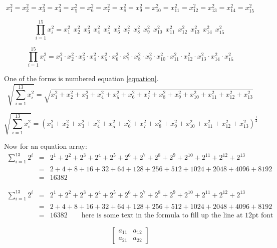 \documentclass[12pt,a4paper,onecolumn]{article}
\begin{document}
\begin{displaymath}
x_1^2 = x_2^2 = x_3^2 = x_4^2 = x_5^2 = x_6^2 = x_7^2 = x_8^2 = x_9^2 = x_{10}^2 = x_{11}^2 = x_{12}^2 = x_{13}^2 = x_{14}^2 = x_{15}^2 
\end{displaymath}

\[
\prod_{i=1}^{15} x_i^2 = x_1^2\ \ x_2^2\ \ x_3^2\ \ x_4^2\ \ x_5^2\ \ x_6^2\ \ x_7^2\ \ x_8^2\ \ x_9^2\ \ x_{10}^2\ \ x_{11}^2\ \ x_{12}^2\ \ x_{13}^2\ \ x_{14}^2\ \ x_{15}^2\ 
\]

$$
\prod_{i=1}^{15} x_i^2 = x_1^2 \cdot x_2^2 \cdot x_3^2 \cdot x_4^2 \cdot x_5^2 \cdot x_6^2 \cdot x_7^2 \cdot x_8^2 \cdot x_9^2 \cdot x_{10}^2 \cdot x_{11}^2 \cdot x_{12}^2 \cdot x_{13}^2 \cdot x_{14}^2 \cdot x_{15}^2 
$$

One of the forms is numbered equation \ref{equation}.
\[
\sqrt{\sum_{i=1}^{13} x_i^2} = \sqrt{x_1^2 + x_2^2 + x_3^2 + x_4^2 + x_5^2 + x_6^2 + x_7^2 + x_8^2 + x_9^2 + x_{10}^2+ x_{11}^2 + x_{12}^2 + x_{13}^2 }
\]

\[
\sqrt{\sum_{i=1}^{13} x_i^2} = \left(x_1^2 + x_2^2 + x_3^2 + x_4^2 + x_5^2 + x_6^2 + x_7^2 + x_8^2 + x_9^2 + x_{10}^2+ x_{11}^2 + x_{12}^2 + x_{13}^2 \right)^{\frac{1}{2}}
\]

Now for an equation array:
\begin{eqnarray}
\sum_{i=1}^{13} 2^i &=& 2^1 + 2^2 + 2^3 + 2^4 + 2^5 + 2^6 + 2^7 + 2^8 + 2^9 + 2^{10} + 2^{11} + 2^{12} + 2^{13}\nonumber\\
&=&2 + 4 + 8 + 16 + 32 + 64 + 128 + 256 + 512 + 1024 + 2048 + 4096 + 8192 \nonumber\\
&=&16382 
\end{eqnarray}

\begin{eqnarray*}
\sum_{i=1}^{13} 2^i &=& 2^1 + 2^2 + 2^3 + 2^4 + 2^5 + 2^6 + 2^7 + 2^8 + 2^9 + 2^{10} + 2^{11} + 2^{12} + 2^{13}\\
&=&2 + 4 + 8 + 16 + 32 + 64 + 128 + 256 + 512 + 1024 + 2048 + 4096 + 8192\\
&=&16382 \qquad\mbox{here is some text in the formula to fill up the line at 12pt font}
\end{eqnarray*}

\[
\left[\begin{array}{cc} a_{11} & a_{12}\\ a_{21} & a_{22}\end{array}\right]
\]
\end{document}
